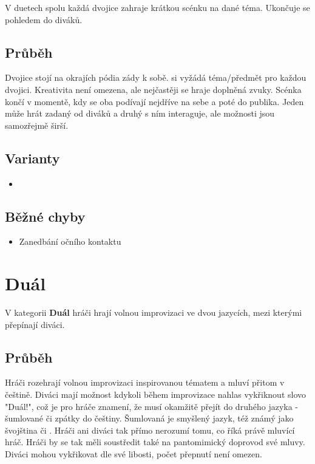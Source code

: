 V duetech spolu každá dvojice zahraje krátkou scénku na dané téma. Ukončuje se pohledem do diváků. 
 
\subsection{ Průběh } Dvojice stojí na okrajích pódia zády k sobě.  si vyžádá téma/předmět pro každou dvojici. Kreativita není omezena, ale nejčastěji se hraje  doplněná zvuky. Scénka končí v momentě, kdy se oba podívají nejdříve na sebe a poté do publika. 
Jeden  může hrát  zadaný od diváků a druhý s ním interaguje, ale možnosti jsou samozřejmě širší. 
 
\subsection{ Varianty } \begin{itemize}
\item {}
\end{itemize}
 
\subsection{ Běžné chyby } \begin{itemize}
\item Zanedbání očního kontaktu
\end{itemize}
 
 
 
 
\needspace{5cm} \section{Duál} \label{duál}  
 
V kategorii \textbf{Duál}{} hráči hrají volnou improvizaci ve dvou jazycích, mezi kterými přepínají diváci. 
 
\subsection{Průběh} Hráči rozehrají volnou improvizaci inspirovanou tématem a mluví přitom v češtině. Diváci mají možnost kdykoli během improvizace nahlas vykřiknout slovo "Duál!", což je pro hráče znamení, že musí okamžitě přejít do druhého jazyka - šumlované či zpátky do češtiny. Šumlovaná je smyšlený jazyk, též známý jako švojština či . Hráči ani diváci tak přímo nerozumí tomu, co říká právě mluvící hráč. Hráči by se tak měli soustředit také na pantomimický doprovod své mluvy. Diváci mohou vykřikovat dle své libosti, počet přepnutí není omezen.  
 
